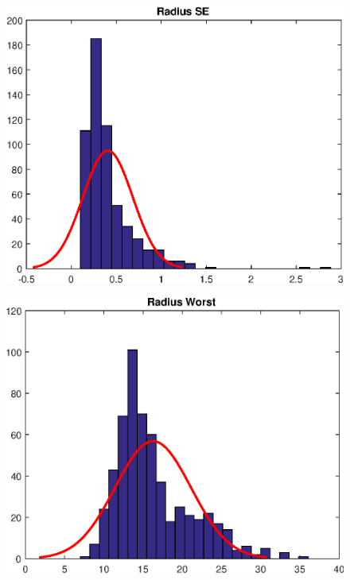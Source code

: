 \documentclass[11pt,a4paper]{article}
\numberwithin{equation}{section}
\begin{document}
\begin{itemize}
\begin{figure}[H]
\centering
\begin{minipage}{.5\textwidth}
  \centering
  \includegraphics[width=\linewidth]{./img/radius_se}
  \label{fig:test1}
\end{minipage}%
\begin{minipage}{.5\textwidth}
  \centering
  \includegraphics[width=\linewidth]{./img/radius_worst}
  \label{fig:test2}
\end{minipage}
\end{figure}


\end{itemize}
\end{document}
